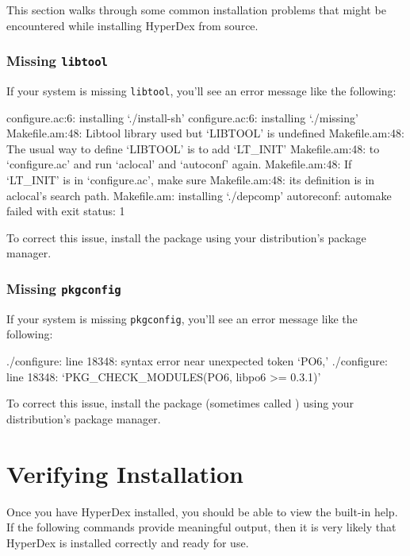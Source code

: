 This section walks through some common installation problems that might be
encountered while installing HyperDex from source.

\subsubsection{Missing \texttt{libtool}}
\label{sec:installation:troubleshooting:libtool}

If your system is missing \texttt{libtool}, you'll see an error message like the
following:

\begin{consolecode}
configure.ac:6: installing `./install-sh'
configure.ac:6: installing `./missing'
Makefile.am:48: Libtool library used but `LIBTOOL' is undefined
Makefile.am:48:   The usual way to define `LIBTOOL' is to add `LT_INIT'
Makefile.am:48:   to `configure.ac' and run `aclocal' and `autoconf' again.
Makefile.am:48:   If `LT_INIT' is in `configure.ac', make sure
Makefile.am:48:   its definition is in aclocal's search path.
Makefile.am: installing `./depcomp'
autoreconf: automake failed with exit status: 1
\end{consolecode}

To correct this issue, install the  package using your
distribution's package manager.

\subsubsection{Missing \texttt{pkgconfig}}
\label{sec:installation:troubleshooting:pkgconfig}

If your system is missing \texttt{pkgconfig}, you'll see an error message like
the following:

\begin{consolecode}
./configure: line 18348: syntax error near unexpected token `PO6,'
./configure: line 18348: `PKG_CHECK_MODULES(PO6, libpo6 >= 0.3.1)'
\end{consolecode}

To correct this issue, install the  package (sometimes called
) using your distribution's package manager.

\section{Verifying Installation}
\label{sec:installation:verify}

Once you have HyperDex installed, you should be able to view the built-in help.
If the following commands provide meaningful output, then it is very likely that
HyperDex is installed correctly and ready for use.

